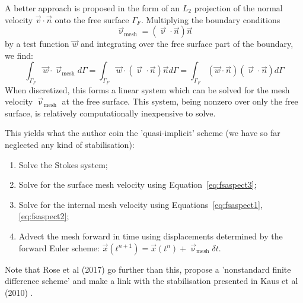 A better approach is proposed in the form of an $L_2$ projection of the 
normal velocity $\vec{v}\cdot\vec{n}$ onto the free surface $\Gamma_F$. 
Multiplying the boundary conditions 
\[
\vec{\upnu}_{\text{mesh}} = (\vec{\upnu}\cdot\vec{n})\vec{n} 
\]
by a test function $\vec{w}$ and integrating over the free surface part of the boundary, we find:
\begin{equation}
\int_{\Gamma_F} \vec{w}\cdot\vec{\upnu}_{\text{mesh}} d\Gamma 
=
\int_{\Gamma_F} \vec{w}\cdot (\vec{\upnu}\cdot\vec{n})\vec{n} d\Gamma
=
\int_{\Gamma_F} (\vec{w}\cdot\vec{n}) (\vec{\upnu}\cdot\vec{n}) d\Gamma \label{eq:fsaspect3}
\end{equation}
When discretized, this forms a linear system which can be
solved for the mesh velocity $\vec{\upnu}_{\text{mesh}}$ 
at the free surface. 
This system, being nonzero over only the
free surface, is relatively computationally inexpensive to solve.

This yields what the author coin the 'quasi-implicit' scheme 
(we have so far neglected any kind of stabilisation):
\begin{enumerate}
\item Solve the Stokes system;
\item Solve for the surface mesh velocity using Equation~\ref{eq:fsaspect3};
\item Solve for the internal mesh velocity using Equations~\ref{eq:fsaspect1}, \ref{eq:fsaspect2}; 
\item Advect the mesh forward in time using displacements determined by
the forward Euler scheme: $\vec{x}(t^{n+1} ) = \vec{x}(t^n ) + \vec{\upnu}_{\text{mesh}} \delta t$.
\end{enumerate}

Note that Rose et al (2017) \cite{robh17} go further than this, propose a 'nonstandard finite difference scheme' and make a link with the stabilisation presented in Kaus et al (2010) \cite{kamm10}.

